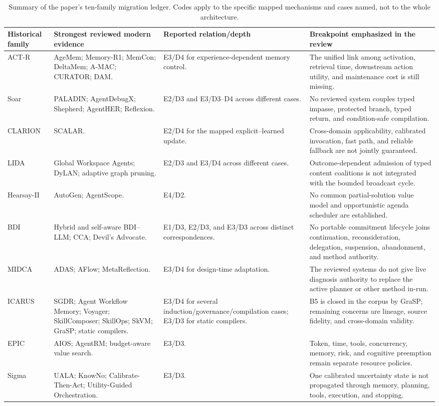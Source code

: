 \begin{table}[tbp]
\centering
\scriptsize
\caption{Summary of the paper's ten-family migration ledger. Codes apply to the specific mapped mechanisms and cases named, not to the whole architecture.}
\label{tab:ch11-migration-ledger}
\begin{tabularx}{\textwidth}{@{}p{}p{}p{}X@{}}
\toprule
\textbf{Historical family} & \textbf{Strongest reviewed modern evidence} & \textbf{Reported relation/depth} & \textbf{Breakpoint emphasized in the review}\\
\midrule
ACT-R & AgeMem; Memory-R1; MemCon; DeltaMem; A-MAC; CURATOR; DAM. & E3/D4 for experience-dependent memory control. & The unified link among activation, retrieval time, downstream action utility, and maintenance cost is still missing.\\
Soar & PALADIN; AgentDebugX; Shepherd; AgentHER; Reflexion. & E2/D3 and E3/D3--D4 across different cases. & No reviewed system couples typed impasse, protected branch, typed return, and condition-safe compilation.\\
CLARION & SCALAR. & E2/D4 for the mapped explicit--learned update. & Cross-domain applicability, calibrated invocation, fast path, and reliable fallback are not jointly guaranteed.\\
LIDA & Global Workspace Agents; DyLAN; adaptive graph pruning. & E2/D3 and E3/D4 across different cases. & Outcome-dependent admission of typed content coalitions is not integrated with the bounded broadcast cycle.\\
Hearsay-II & AutoGen; AgentScope. & E4/D2. & No common partial-solution value model and opportunistic agenda scheduler are established.\\
BDI & Hybrid and self-aware BDI--LLM; CCA; Devil's Advocate. & E1/D3, E2/D3, and E3/D3 across distinct correspondences. & No portable commitment lifecycle joins continuation, reconsideration, delegation, suspension, abandonment, and method authority.\\
MIDCA & ADAS; AFlow; MetaReflection. & E3/D4 for design-time adaptation. & The reviewed systems do not give live diagnosis authority to replace the active planner or other method in-run.\\
ICARUS & SGDR; Agent Workflow Memory; Voyager; SkillComposer; SkillOps; SkVM; GraSP; static compilers. & E3/D4 for several induction/governance/compilation cases; E3/D3 for static compilers. & B5 is closed in the corpus by GraSP; remaining concerns are lineage, source fidelity, and cross-domain validity.\\
EPIC & AIOS; AgentRM; budget-aware value search. & E3/D3. & Token, time, tools, concurrency, memory, risk, and cognitive preemption remain separate resource policies.\\
Sigma & UALA; KnowNo; Calibrate-Then-Act; Utility-Guided Orchestration. & E3/D3. & One calibrated uncertainty state is not propagated through memory, planning, tools, execution, and stopping.\\
\bottomrule
\end{tabularx}
\end{table}

